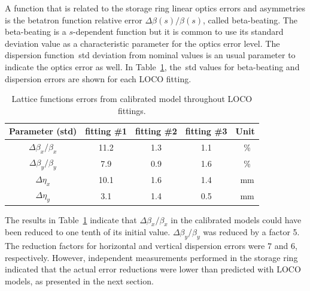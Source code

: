A function that is related to the storage ring linear optics errors and asymmetries is the betatron function relative error $\Delta \beta(s)/\beta(s)$, called beta-beating. The beta-beating is a $s$-dependent function but it is common to use its standard deviation value as a characteristic parameter for the optics error level. The dispersion function~\gls{std} deviation from nominal values is an usual parameter to indicate the optics error as well. In Table~\ref{tab:calibrated_optics}, the~\gls{std} values for beta-beating and dispersion errors are shown for each LOCO fitting.
\begin{table}
    \centering
    \caption{Lattice functions errors from calibrated model throughout LOCO fittings.}
    \label{tab:calibrated_optics}
    \begin{tabular}{ccccc}
        \toprule\toprule
        Parameter (std) & fitting \#1 & fitting \#2 & fitting \#3 & Unit \\
        \hline
        $\Delta\beta_x/\beta_x$ & \num{11.2} & \num{1.3} & \num{1.1} &\SI{}{\%}  \\
        $\Delta\beta_y/\beta_y$ & \num{7.9} & \num{0.9} & \num{1.6} &\SI{}{\%} \\
        $\Delta\eta_x$ &  \num{10.1} &  \num{1.6} & \num{1.4} & \SI{}{\milli\meter}  \\
        $\Delta\eta_y$ &  \num{3.1} &  \num{1.4} & \num{0.5} & \SI{}{\milli\meter} \\
        \bottomrule\bottomrule
    \end{tabular}
\end{table}

The results in Table~\ref{tab:calibrated_optics} indicate that $\Delta\beta_x/\beta_x$ in the calibrated models could have been reduced to one tenth of its initial value. $\Delta\beta_y/\beta_y$ was reduced by a factor 5. The reduction factors for horizontal and vertical dispersion errors were $7$ and $6$, respectively. However, independent measurements performed in the storage ring indicated that the actual error reductions were lower than predicted with LOCO models, as presented in the next section. 

